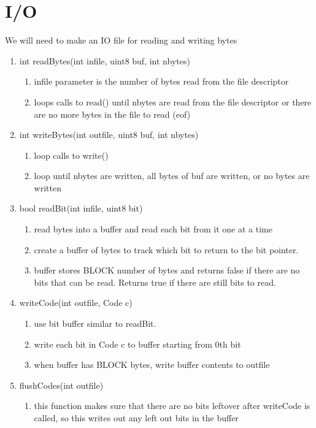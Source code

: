 \documentclass[11pt]{article}
\begin{document}
\section{I/O}\label{ss:IO}
We will need to make an IO file for reading and writing bytes
\begin{enumerate}
\item int readBytes(int infile, uint8 buf, int nbytes)
	\begin{enumerate}
	\item infile parameter is the number of bytes read from the file descriptor
	\item loops calls to read() until nbytes are read from the file descriptor or there are no more bytes in the file to read (eof)
	\end{enumerate}
\item int writeBytes(int outfile, uint8 buf, int nbytes)
	\begin{enumerate}
	\item loop calls to write()
	\item loop until nbytes are written, all bytes of buf are written, or no bytes are written
	\end{enumerate}
\item bool readBit(int infile, uint8 bit)
	\begin{enumerate}
	\item read bytes into a buffer and read each bit from it one at a time
	\item create a buffer of bytes to track which bit to return to the bit pointer.
	\item buffer stores BLOCK number of bytes and returns false if there are no bits that can be read. Returns true if there are still bits to read.
	\end{enumerate}
\item writeCode(int outfile, Code c)
	\begin{enumerate}
	\item use bit buffer similar to readBit.
	\item write each bit in Code c to buffer starting from 0th bit
	\item when buffer has BLOCK bytes, write buffer contents to outfile
	\end{enumerate}
\item flushCodes(int outfile)
	\begin{enumerate}
	\item this function makes sure that there are no bits leftover after writeCode is called, so this writes out any left out bits in the buffer
	\end{enumerate}
\end{enumerate}
\end{document}
